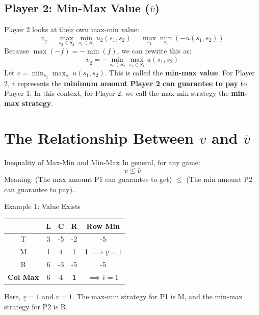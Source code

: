 \documentclass[12pt, a4paper]{article}
\begin{document}
\subsection{Player 2: Min-Max Value ($\overline{v}$)}
Player 2 looks at their own max-min value:
\[
  \underline{v}_2 = \max_{s_2 \in S_2} \min_{s_1 \in S_1} u_2(s_1, s_2) = \max_{s_2} \min_{s_1} (-u(s_1, s_2))
\]
Because $\max(-f) = -\min(f)$, we can rewrite this as:
\[
  \underline{v}_2 = -\min_{s_2 \in S_2} \max_{s_1 \in S_1} u(s_1, s_2)
\]
Let $\overline{v} = \min_{s_2} \max_{s_1} u(s_1, s_2)$. This is called the \textbf{min-max value}.
For Player 2, $\overline{v}$ represents the \textbf{minimum amount Player 2 can guarantee to pay} to Player 1.
In this context, for Player 2, we call the max-min strategy the \textbf{min-max strategy}.

\section{The Relationship Between $\underline{v}$ and $\overline{v}$}

\begin{thmbox}{Inequality of Max-Min and Min-Max}
  In general, for any game:
  \[
    \underline{v} \leq \overline{v}
  \]
  Meaning: (The max amount P1 can guarantee to get) $\leq$ (The min amount P2 can guarantee to pay).
\end{thmbox}

\begin{exbox}{Example 1: Value Exists}
  \begin{center}
  \renewcommand{\arraystretch}{1.3}
  \begin{tabular}{c|ccc|c}
    & L & C & R & \textbf{Row Min} \\
    \hline
    T & 3 & -5 & -2 & -5 \\
    M & 1 & 4 & 1 & \textbf{\color{defblue} 1} $\implies \underline{v} = 1$ \\
    B & 6 & -3 & -5 & -5 \\
    \hline
    \textbf{Col Max} & 6 & 4 & \textbf{\color{defblue} 1} & $\implies \overline{v} = 1$
  \end{tabular}
  \end{center}
  Here, $\underline{v} = 1$ and $\overline{v} = 1$. The max-min strategy for P1 is M, and the min-max strategy for P2 is R.
\end{exbox}
\end{document}
